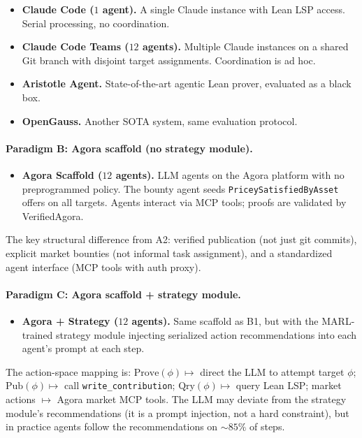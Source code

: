 \begin{itemize}
    \item[\textbf{A1.}] \textbf{Claude Code ($1$ agent).} A single Claude instance with Lean LSP access. Serial processing, no coordination.
    
    \item[\textbf{A2.}] \textbf{Claude Code Teams ($12$ agents).} Multiple Claude instances on a shared Git branch with disjoint target assignments. Coordination is ad hoc.
    
    \item[\textbf{A3.}] \textbf{Aristotle Agent.} State-of-the-art agentic Lean prover, evaluated as a black box.
    
    \item[\textbf{A4.}] \textbf{OpenGauss.} Another SOTA system, same evaluation protocol.
\end{itemize}

\paragraph{Paradigm B: Agora scaffold (no strategy module).}

\begin{itemize}
    \item[\textbf{B1.}] \textbf{Agora Scaffold ($12$ agents).} LLM agents on the Agora platform with no preprogrammed policy. The bounty agent seeds \texttt{PriceySatisfiedByAsset} offers on all targets. Agents interact via MCP tools; proofs are validated by VerifiedAgora.
\end{itemize}

The key structural difference from A2: verified publication (not just git commits), explicit market bounties (not informal task assignment), and a standardized agent interface (MCP tools with auth proxy).

\paragraph{Paradigm C: Agora scaffold + strategy module.}

\begin{itemize}
    \item[\textbf{C1.}] \textbf{Agora + Strategy ($12$ agents).} Same scaffold as B1, but with the MARL-trained strategy module injecting serialized action recommendations into each agent's prompt at each step.
\end{itemize}

\begin{remark}
The action-space mapping is: $\mathrm{Prove}(\phi) \mapsto$ direct the LLM to attempt target $\phi$; $\mathrm{Pub}(\phi) \mapsto$ call \texttt{write\_contribution}; $\mathrm{Qry}(\phi) \mapsto$ query Lean LSP; market actions $\mapsto$ Agora market MCP tools. The LLM may deviate from the strategy module's recommendations (it is a prompt injection, not a hard constraint), but in practice agents follow the recommendations on ${\sim}85\%$ of steps.
\end{remark}

